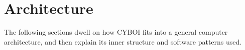 %
%
%
%
%
%
%

\section{Architecture}
\label{architecture_heading}

The following sections dwell on how CYBOI fits into a general computer
architecture, and then explain its inner structure and software patterns used.






